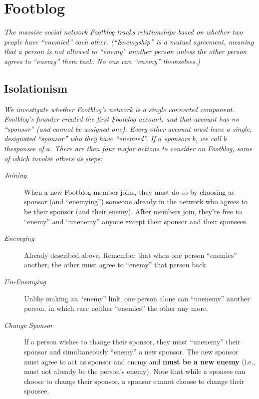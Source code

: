 \documentclass[11pt, oneside]{article}   	%
\theoremstyle{definition}
\theoremstyle{remark}
\begin{document}
\cleardoublepage
\section{Footblog}
\textit{The massive social network Footblog tracks relationships based on
whether two people have ``enemied'' each other. (``Enemyship'' is a mutual agreement, meaning that a person is not allowed to ``enemy'' another person unless the other person agrees to ``enemy'' them back. No one can ``enemy'' themselves.)}

\subsection{Isolationism}
\textit{We investigate whether Footblog's network is a single connected
component. Footblog's founder created the first Footblog account, and that account has no ``sponsor'' (and cannot be assigned one). Every other account must have a single, designated ``sponsor'' who they have ``enemied''. If $a$ sponsors $b$, we call $b$ the\emph{sponsee} of $a$. There are then four major actions to consider on Footblog, some of which involve others as steps:}
\begin{description}
	\item[\emph{Joining}] When a new Footblog member joins, they must do so by
               choosing as sponsor (and ``enemying'') someone already in
               the network who agrees to be their sponsor (and their
               enemy). After members join, they're free to ``enemy''
               and ``unenemy'' anyone except their sponsor and their
               sponsees.
	\item[\emph{Enemying}] Already described above. Remember that when one person
                ``enemies'' another, the other must agree to ``enemy''
                that person back.
	\item[\emph{Un-Enemying}] Unlike making an ``enemy'' link, one person alone can
                   ``unenemy'' another person, in which case neither
                   ``enemies'' the other any more.
	\item[\emph{Change Sponsor}] If a person wishes to change their sponsor, they
     must ``unenemy'' their sponsor and simultaneously ``enemy'' a new
     sponsor. The new sponsor must agree to act as sponsor and enemy
     and \textbf{must be a new enemy} (i.e., must not already be the person's
     enemy). Note that while a sponsee can choose to change their
     sponsor, a sponsor cannot choose to change their sponsee.
\end{description}
\end{document}

